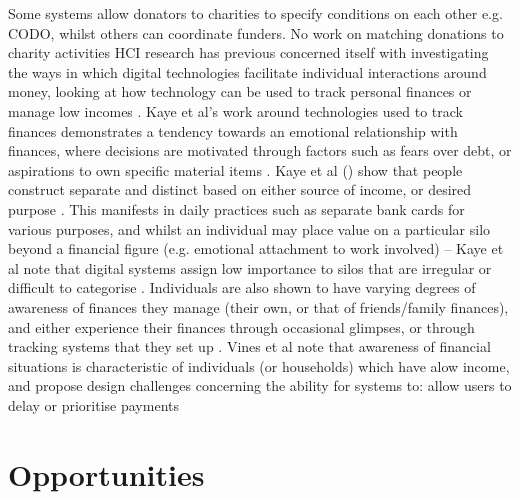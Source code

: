 
 Some systems allow donators to charities to specify conditions on each other e.g. CODO, whilst others can coordinate funders. No work on matching donations to charity activities
%
HCI research has previous concerned itself with investigating the ways in which digital technologies facilitate individual interactions around money, looking at how technology can be used to track personal finances or manage low incomes \cite{kaye_money_2014, vines_pay_2014}. Kaye et al's work around technologies used to track finances demonstrates a tendency towards an emotional relationship with finances, where decisions are motivated through factors such as fears over debt, or aspirations to own specific material items \cite{kaye_money_2014}. 
%
Kaye et al () show that people construct separate and distinct  based on either source of income, or desired purpose \cite{kaye_money_2014}. This manifests in daily practices such as separate bank cards for various purposes, and whilst an individual may place value on a particular silo beyond a financial figure (e.g. emotional attachment to work involved) -- Kaye et al note that digital systems assign low importance to silos that are irregular or difficult to categorise \cite{kaye_money_2014}. Individuals are also shown to have varying degrees of awareness of finances they manage (their own, or that of friends/family finances), and either experience their finances through occasional glimpses, or through tracking systems that they set up \cite{kaye_money_2014}. Vines et al note that awareness of financial situations is characteristic of individuals (or households) which have  alow income, and propose design challenges concerning the ability for systems to: allow users to delay or prioritise payments



\section{Opportunities}

